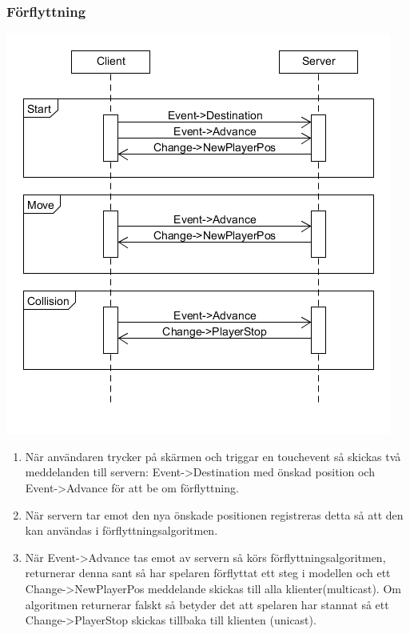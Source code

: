 \documentclass[10pt, titlepage, oneside, a4paper]{article}
\begin{document}
    	\subsubsection{Förflyttning}
    	\begin{center}
    		\includegraphics[scale=.5]{./png/MoveProtocol.png}
    	\end{center}
    	
    	\begin{enumerate}
    		\item När användaren trycker på skärmen och triggar en touchevent så skickas två meddelanden till servern: Event->Destination med önskad position och Event->Advance för att be om förflyttning.
    		\item När servern tar emot den nya önskade positionen registreras detta så att den kan användas i förflyttningsalgoritmen. 
    		\item När Event->Advance tas emot av servern så körs förflyttningsalgoritmen, returnerar denna sant så har spelaren förflyttat ett steg i modellen och ett Change->NewPlayerPos meddelande skickas till alla klienter(multicast). Om algoritmen returnerar falskt så betyder det att spelaren har stannat så ett Change->PlayerStop skickas tillbaka till klienten (unicast).
    	\end{enumerate}
    	
\end{document}
